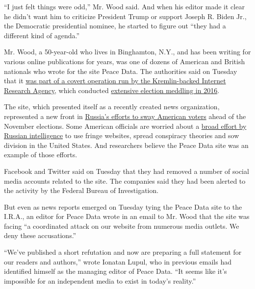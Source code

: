 ``I just felt things were odd,'' Mr. Wood said. And when his editor made
it clear he didn't want him to criticize President Trump or support
Joseph R. Biden Jr., the Democratic presidential nominee, he started to
figure out ``they had a different kind of agenda.''

Mr. Wood, a 50-year-old who lives in Binghamton, N.Y., and has been
writing for various online publications for years, was one of dozens of
American and British nationals who wrote for the site Peace Data. The
authorities said on Tuesday that it
\href{https://www.nytimes3xbfgragh.onion/2020/09/01/technology/facebook-russia-disinformation-election.html}{was
part of a covert operation run by the Kremlin-backed Internet Research
Agency}, which conducted
\href{https://www.nytimes3xbfgragh.onion/2018/02/17/technology/indictment-russian-tech-facebook.html?action=click\&module=RelatedLinks\&pgtype=Article}{extensive
election meddling in 2016}.

The site, which presented itself as a recently created news
organization, represented a new front in
\href{https://www.nytimes3xbfgragh.onion/2020/01/10/us/politics/russia-hacking-disinformation-election.html?action=click\&module=RelatedLinks\&pgtype=Article}{Russia's
efforts to sway American voters} ahead of the November elections. Some
American officials are worried about a
\href{https://www.nytimes3xbfgragh.onion/2020/08/07/us/politics/russia-china-trump-biden-election-interference.html}{broad
effort by Russian intelligence} to use fringe websites, spread
conspiracy theories and sow division in the United States. And
researchers believe the Peace Data site was an example of those efforts.

Facebook and Twitter said on Tuesday that they had removed a number of
social media accounts related to the site. The companies said they had
been alerted to the activity by the Federal Bureau of Investigation.

But even as news reports emerged on Tuesday tying the Peace Data site to
the I.R.A., an editor for Peace Data wrote in an email to Mr. Wood that
the site was facing ``a coordinated attack on our website from numerous
media outlets. We deny these accusations.''

``We've published a short refutation and now are preparing a full
statement for our readers and authors,'' wrote Ionatan Lupul, who in
previous emails had identified himself as the managing editor of Peace
Data. ``It seems like it's impossible for an independent media to exist
in today's reality.''

